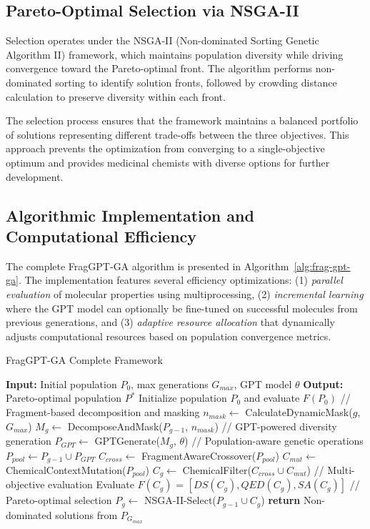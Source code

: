 \documentclass[lettersize,journal]{IEEEtran}
\begin{document}
\subsection{Pareto-Optimal Selection via NSGA-II}

Selection operates under the NSGA-II (Non-dominated Sorting Genetic Algorithm II) framework, which maintains population diversity while driving convergence toward the Pareto-optimal front. The algorithm performs non-dominated sorting to identify solution fronts, followed by crowding distance calculation to preserve diversity within each front.

The selection process ensures that the framework maintains a balanced portfolio of solutions representing different trade-offs between the three objectives. This approach prevents the optimization from converging to a single-objective optimum and provides medicinal chemists with diverse options for further development.

\subsection{Algorithmic Implementation and Computational Efficiency}

The complete FragGPT-GA algorithm is presented in Algorithm~\ref{alg:frag-gpt-ga}. The implementation features several efficiency optimizations: (1) \textit{parallel evaluation} of molecular properties using multiprocessing, (2) \textit{incremental learning} where the GPT model can optionally be fine-tuned on successful molecules from previous generations, and (3) \textit{adaptive resource allocation} that dynamically adjusts computational resources based on population convergence metrics.

\begin{algorithm}[!t]
\caption{FragGPT-GA Complete Framework}
\label{alg:frag-gpt-ga}
\begin{algorithmic}
\STATE \textbf{Input:} Initial population $P_0$, max generations $G_{max}$, GPT model $\theta$
\STATE \textbf{Output:} Pareto-optimal population $P^*$
\STATE Initialize population $P_0$ and evaluate $F(P_0)$
    \STATE // Fragment-based decomposition and masking
    \STATE $n_{mask} \leftarrow$ CalculateDynamicMask($g$, $G_{max}$)
    \STATE $M_g \leftarrow$ DecomposeAndMask($P_{g-1}$, $n_{mask}$)
    \STATE // GPT-powered diversity generation
    \STATE $P_{GPT} \leftarrow$ GPTGenerate($M_g$, $\theta$)
    \STATE // Population-aware genetic operations
    \STATE $P_{pool} \leftarrow P_{g-1} \cup P_{GPT}$
    \STATE $C_{cross} \leftarrow$ FragmentAwareCrossover($P_{pool}$)
    \STATE $C_{mut} \leftarrow$ ChemicalContextMutation($P_{pool}$)
    \STATE $C_g \leftarrow$ ChemicalFilter($C_{cross} \cup C_{mut}$)
    \STATE // Multi-objective evaluation
    \STATE Evaluate $F(C_g)$ = $[DS(C_g), QED(C_g), SA(C_g)]$
    \STATE // Pareto-optimal selection
    \STATE $P_g \leftarrow$ NSGA-II-Select($P_{g-1} \cup C_g$)
\ENDFOR
\STATE \textbf{return} Non-dominated solutions from $P_{G_{max}}$
\end{algorithmic}
\end{algorithm}
\end{document}
